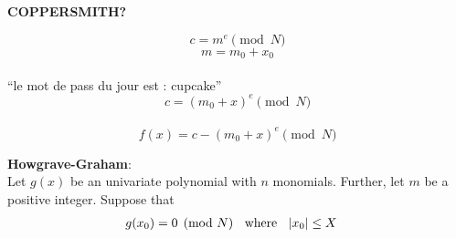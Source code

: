 \documentclass{beamer}
\begin{document}
\fontsize{35pt}{15.2}\selectfont
{}
\begin{frame}
\begin{center}

\textbf{COPPERSMITH?}
\end{center}
\end{frame}

\fontsize{16pt}{15.2}\selectfont
\usebackgroundtemplate{}
\begin{frame}
\[c = m^e \pmod{N} \]
\pause
\[m = m_0 + x_0\]\\ \vspace{.5cm}
\pause
``le mot de pass du jour est : cupcake''\\
\pause
\[c = (m_0 + x)^e \pmod{N} \]\\
\pause
\[ f(x) = c - (m_0 + x)^e \pmod{N} \]
\end{frame}

\begin{frame}
\end{frame}

\fontsize{14pt}{15.2}\selectfont
\begin{frame}
\textbf{Howgrave-Graham}: \\
Let $g(x)$ be an univariate polynomial with $n$ monomials. Further, let $m$ be a positive integer. Suppose that\pause 
\setcounter{equation}{0}
\begin{align}
&g(x_0) = 0 \pmod{N} \hspace{2mm} \text{ where } \hspace{2mm} |x_0| \leq X
\end{align}

\end{frame}
\end{document}
